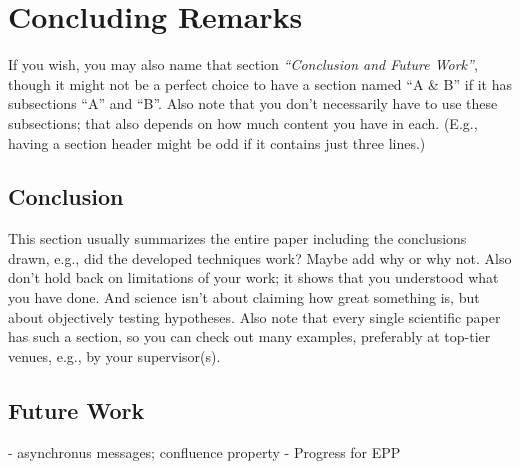 \chapter{Concluding Remarks}\label{chap:conclusion}

If you wish, you may also name that section \emph{``Conclusion and Future Work''}, though it might not be a perfect choice to have a section named ``A \& B'' if it has subsections ``A'' and ``B''. Also note that you don't necessarily have to use these subsections; that also depends on how much content you have in each. (E.g., having a section header might be odd if it contains just three lines.)


\section{Conclusion}

This section usually summarizes the entire paper including the conclusions drawn, e.g., did the developed techniques work? Maybe add why or why not. Also don't hold back on limitations of your work; it shows that you understood what you have done. And science isn't about claiming how great something is, but about objectively testing hypotheses. Also note that every single scientific paper has such a section, so you can check out many examples, preferably at top-tier venues, e.g., by your supervisor(s).


\section{Future Work}

- asynchronus messages; confluence property
- Progress for EPP
